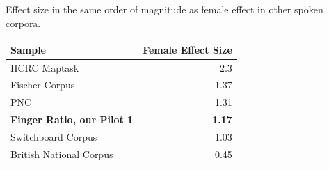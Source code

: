 \documentclass[a0,portrait]{a0poster}
\begin{document}
\begin{multicols}{2}
Effect size in the same order of magnitude as female effect in other spoken corpora.
\begin{center}
\begin{tabular}{l r}
\toprule
\textbf{Sample} & \textbf{Female Effect Size}\\
\midrule
HCRC Maptask & 2.3\\
Fischer Corpus & 1.37\\
PNC & 1.31\\
\textbf{Finger Ratio, our Pilot 1} & \textbf{1.17}\\
Switchboard Corpus & 1.03\\
British National Corpus & 0.45\\
\bottomrule
\end{tabular}
\end{center}



\end{multicols}
\end{document}
